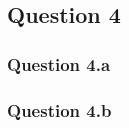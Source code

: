 
\subsection{Question 4}
\label{subsec:314}

\subsubsection{Question 4.a}
\label{subsubsec:314a}

\subsubsection{Question 4.b}
\label{subsubsec:314b}